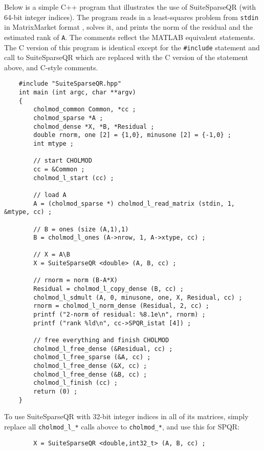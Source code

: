 \documentclass[12pt]{article}
\begin{document}
Below is a simple C++ program that illustrates the use of SuiteSparseQR
(with 64-bit integer indices).  The
program reads in a least-squares problem from \verb'stdin' in MatrixMarket
format \cite{BoisvertPozoRemingtonBarrettDongarra97}, solves it, and prints the
norm of the residual and the estimated rank of \verb'A'.  The comments reflect
the MATLAB equivalent statements.  The C version of this program is identical
except for the \verb'#include' statement and call to SuiteSparseQR which are
replaced with the C version of the statement above, and C-style comments.

{\footnotesize
\begin{verbatim}
    #include "SuiteSparseQR.hpp"
    int main (int argc, char **argv)
    {
        cholmod_common Common, *cc ;
        cholmod_sparse *A ;
        cholmod_dense *X, *B, *Residual ;
        double rnorm, one [2] = {1,0}, minusone [2] = {-1,0} ;
        int mtype ;

        // start CHOLMOD
        cc = &Common ;
        cholmod_l_start (cc) ;

        // load A
        A = (cholmod_sparse *) cholmod_l_read_matrix (stdin, 1, &mtype, cc) ;

        // B = ones (size (A,1),1)
        B = cholmod_l_ones (A->nrow, 1, A->xtype, cc) ;

        // X = A\B
        X = SuiteSparseQR <double> (A, B, cc) ;

        // rnorm = norm (B-A*X)
        Residual = cholmod_l_copy_dense (B, cc) ;
        cholmod_l_sdmult (A, 0, minusone, one, X, Residual, cc) ;
        rnorm = cholmod_l_norm_dense (Residual, 2, cc) ;
        printf ("2-norm of residual: %8.1e\n", rnorm) ;
        printf ("rank %ld\n", cc->SPQR_istat [4]) ;

        // free everything and finish CHOLMOD
        cholmod_l_free_dense (&Residual, cc) ;
        cholmod_l_free_sparse (&A, cc) ;
        cholmod_l_free_dense (&X, cc) ;
        cholmod_l_free_dense (&B, cc) ;
        cholmod_l_finish (cc) ;
        return (0) ;
    }
\end{verbatim}
}

To use SuiteSparseQR with 32-bit integer indices in all of its matrices,
simply replace all \verb'cholmod_l_*' calls abovce to \verb'cholmod_*',
and use this for SPQR:

{\footnotesize
\begin{verbatim}
        X = SuiteSparseQR <double,int32_t> (A, B, cc) ;
\end{verbatim}
}
\end{document}
